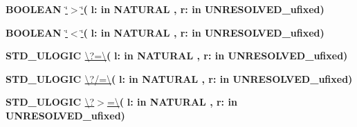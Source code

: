 \begin{DoxyCompactItemize}
\item 
{\bfseries {\bfseries \textcolor{comment}{B\+O\+O\+L\+E\+A\+N}\textcolor{vhdlchar}{ }}} \hyperlink{class__fixed__pkg_ac6c82329bf849852be997a3d0a737cf9}{\char`\"{}$>$\char`\"{}}{\bfseries  ( }{\bfseries \textcolor{vhdlchar}{l\+: }\textcolor{stringliteral}{in }{\bfseries \textcolor{comment}{N\+A\+T\+U\+R\+A\+L}\textcolor{vhdlchar}{ }}}{\bfseries  , \textcolor{vhdlchar}{r\+: }\textcolor{stringliteral}{in }\textcolor{vhdlchar}{U\+N\+R\+E\+S\+O\+L\+V\+E\+D\+\_\+ufixed}}{\bfseries  )} 
\item 
{\bfseries {\bfseries \textcolor{comment}{B\+O\+O\+L\+E\+A\+N}\textcolor{vhdlchar}{ }}} \hyperlink{class__fixed__pkg_a5d059cf3277e3585e4f3f076db10b273}{\char`\"{}$<$\char`\"{}}{\bfseries  ( }{\bfseries \textcolor{vhdlchar}{l\+: }\textcolor{stringliteral}{in }{\bfseries \textcolor{comment}{N\+A\+T\+U\+R\+A\+L}\textcolor{vhdlchar}{ }}}{\bfseries  , \textcolor{vhdlchar}{r\+: }\textcolor{stringliteral}{in }\textcolor{vhdlchar}{U\+N\+R\+E\+S\+O\+L\+V\+E\+D\+\_\+ufixed}}{\bfseries  )} 
\item 
{\bfseries {\bfseries \textcolor{comment}{S\+T\+D\+\_\+\+U\+L\+O\+G\+I\+C}\textcolor{vhdlchar}{ }}} \hyperlink{class__fixed__pkg_a69151531d87456d952c2073704fa1779}{\textbackslash{}?=\textbackslash{}}{\bfseries  ( }{\bfseries \textcolor{vhdlchar}{l\+: }\textcolor{stringliteral}{in }{\bfseries \textcolor{comment}{N\+A\+T\+U\+R\+A\+L}\textcolor{vhdlchar}{ }}}{\bfseries  , \textcolor{vhdlchar}{r\+: }\textcolor{stringliteral}{in }\textcolor{vhdlchar}{U\+N\+R\+E\+S\+O\+L\+V\+E\+D\+\_\+ufixed}}{\bfseries  )} 
\item 
{\bfseries {\bfseries \textcolor{comment}{S\+T\+D\+\_\+\+U\+L\+O\+G\+I\+C}\textcolor{vhdlchar}{ }}} \hyperlink{class__fixed__pkg_a172a73302b09f0d298b93ecda8c5e976}{\textbackslash{}?/=\textbackslash{}}{\bfseries  ( }{\bfseries \textcolor{vhdlchar}{l\+: }\textcolor{stringliteral}{in }{\bfseries \textcolor{comment}{N\+A\+T\+U\+R\+A\+L}\textcolor{vhdlchar}{ }}}{\bfseries  , \textcolor{vhdlchar}{r\+: }\textcolor{stringliteral}{in }\textcolor{vhdlchar}{U\+N\+R\+E\+S\+O\+L\+V\+E\+D\+\_\+ufixed}}{\bfseries  )} 
\item 
{\bfseries {\bfseries \textcolor{comment}{S\+T\+D\+\_\+\+U\+L\+O\+G\+I\+C}\textcolor{vhdlchar}{ }}} \hyperlink{class__fixed__pkg_a3adee8c12e5c0bb76fc3e1a493284a27}{\textbackslash{}?$>$=\textbackslash{}}{\bfseries  ( }{\bfseries \textcolor{vhdlchar}{l\+: }\textcolor{stringliteral}{in }{\bfseries \textcolor{comment}{N\+A\+T\+U\+R\+A\+L}\textcolor{vhdlchar}{ }}}{\bfseries  , \textcolor{vhdlchar}{r\+: }\textcolor{stringliteral}{in }\textcolor{vhdlchar}{U\+N\+R\+E\+S\+O\+L\+V\+E\+D\+\_\+ufixed}}{\bfseries  )} 

\end{DoxyCompactItemize}
